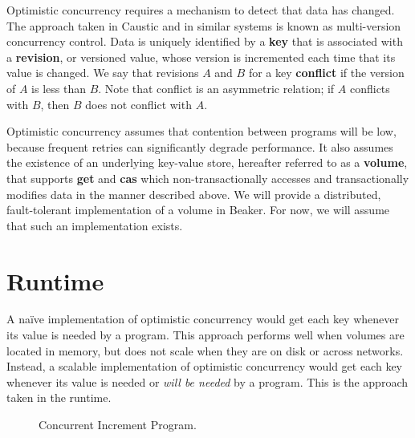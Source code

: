 \documentclass[../main.tex]{subfiles}
\begin{document}
  Optimistic concurrency requires a mechanism to detect that data has changed. The approach taken in
  Caustic and in similar systems is known as multi-version concurrency control. Data is uniquely
  identified by a \textbf{key} that is associated with a \textbf{revision}, or versioned value,
  whose version is incremented each time that its value is changed. We say that revisions $A$ and
  $B$ for a key \textbf{conflict} if the version of $A$ is less than $B$. Note that conflict is an
  asymmetric relation; if $A$ conflicts with $B$, then $B$ does not conflict with $A$.

  Optimistic concurrency assumes that contention between programs will be low, because frequent
  retries can significantly degrade performance. It also assumes the existence of an underlying
  key-value store, hereafter referred to as a \textbf{volume}, that supports \textbf{get} and
  \textbf{cas} which non-transactionally accesses and transactionally modifies data in the manner
  described above. We will provide a distributed, fault-tolerant implementation of a volume in
  Beaker. For now, we will assume that such an implementation exists.

\section{Runtime}
A na\"ive implementation of optimistic concurrency would get each key whenever its value is needed
by a program. This approach performs well when volumes are located in memory, but does not scale
when they are on disk or across networks. Instead, a scalable implementation of optimistic
concurrency would get each key whenever its value is needed or \emph{will be needed} by a program.
This is the approach taken in the runtime.

\begin{figure}[htb]
  \caption{Concurrent Increment Program.}
  \centering
  \label{figure:increment}
\end{figure}
\end{document}
